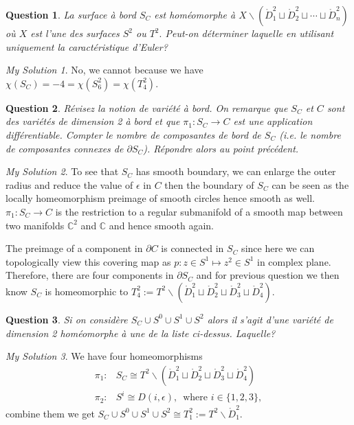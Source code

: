 \documentclass[]{article}
\newtheorem{prop}{Question}
\theoremstyle{remark}
\newtheorem*{sol}{My Solution}
\begin{document}
\begin{prop}
	La surface à bord $S_{C}$ est homéomorphe à $X \backslash\left(\mathring{D}_{1}^{2} \sqcup \mathring{D}_{2}^{2} \sqcup \cdots \sqcup \mathring{D}_{n}^{2}\right)$ où $X$ est l'une des surfaces $S^{2}$ ou $T^{2} .$ Peut-on déterminer laquelle en utilisant uniquement la caractéristique d'Euler?
\end{prop}
\begin{sol}
	No, we cannot because we have $ \chi(S_C) =-4= \chi(S^2_6)=\chi(T^2_4) $.
\end{sol}
\begin{prop}
	Révisez la notion de variété à bord. On remarque que $S_{C}$ et $C$ sont des variétés de dimension 2 à bord et que $\pi_{1}: S_{C} \rightarrow C$ est une application différentiable. Compter le nombre de composantes de bord de $S_{C}$ (i.e. le nombre de composantes connexes de $\partial S_{C}$). Répondre alors au point précédent.
\end{prop}
\begin{sol}
	To see that $ S_C $ has smooth boundary, we can enlarge the outer radius and reduce the value of $ \epsilon $ in $ C $ then the boundary of $ S_C $ can be seen as the  locally homeomorphism preimage of smooth circles hence smooth as well. $ \pi_{1}: S_C \rightarrow C $ is the restriction to a regular submanifold of a smooth map between two manifolds $  \mathbb{C}^2 $ and $ \mathbb{C} $ and hence smooth again.
	
	The preimage of a component in $ \partial C $ is connected in $ S_C $ since here we can topologically view this covering map as $ p: z \in S^1 \mapsto z^2 \in S^1 $ in complex plane. Therefore, there are four components in $ \partial S_C $ and for previous question we then know $ S_C $ is homeomorphic to $T^{2}_{4}:=T^{2} \backslash\left(\mathring{D}_{1}^{2} \sqcup \mathring{D}_{2}^{2} \sqcup \mathring{D}_{3}^{2} \sqcup \mathring{D}_{4}^{2}\right)$.
\end{sol}
\begin{prop}
	Si on considère $S_{C} \cup S^{0} \cup S^{1} \cup S^{2}$ alors il s'agit d'une variété de dimension 2 homéomorphe à une de la liste ci-dessus. Laquelle?
\end{prop}
\begin{sol}
	We have four homeomorphisms
	\begin{align*}
		\pi_{1}:& S_C \cong T^{2} \backslash\left(\mathring{D}_{1}^{2} \sqcup \mathring{D}_{2}^{2} \sqcup \mathring{D}_{3}^{2} \sqcup \mathring{D}_{4}^{2}\right) \\
		\pi_{2}:& S^i \cong D(i,\epsilon),\, \text{ where }i\in \{1,2,3\},		
	\end{align*}
	combine them we get $S_{C} \cup S^{0} \cup S^{1} \cup S^{2} \cong T^{2}_1:=T^{2} \backslash\mathring{D}_{1}^{2}. $
\end{sol}
\end{document}
